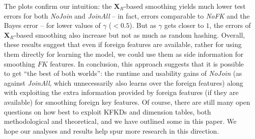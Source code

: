 The plots confirm our intuition: the $\textbf{X}_R$-based smoothing yields much lower test errors for both \textit{NoJoin} and \textit{JoinAll} -- in 
fact, errors comparable to \textit{NoFK} and the Bayes error -- for lower values of $\gamma$ ($<0.5$). But as $\gamma$ gets closer to $1$, the 
errors of $\textbf{X}_R$-based smoothing also increase but not as much as random hashing. Overall, these results suggest that even if foreign features 
are available, rather for using them directly for learning the model, we could use them as side information for smoothing $FK$ features. In conclusion,
this approach suggests that it is possible to get ``the best of both worlds'': the runtime and usability gains of \textit{NoJoin} (as against \textit{JoinAll}, 
which unnecessarily also learns over the foreign features) along with exploiting the extra information provided by foreign features (if they are available)
for smoothing foreign key features. Of course, there are still many open questions on how best to exploit KFKDs and dimension tables, both methodological
and theoretical, and we have outlined some in this paper. We hope our analyses and results help spur more research in this direction.



